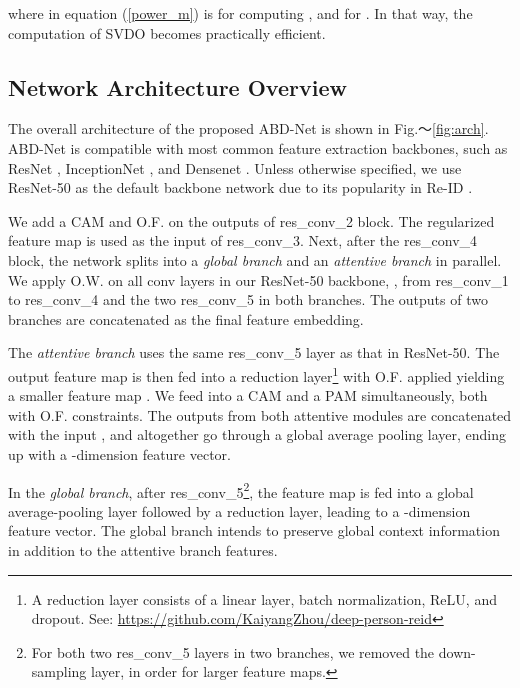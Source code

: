 \documentclass[10pt,twocolumn]{article}
\begin{document}
where  in equation (\ref{power_m}) is  for computing , and  for . In that way, the computation of SVDO becomes practically efficient.

\subsection{Network Architecture Overview} \label{sec:arc_overview}







The overall architecture of the proposed ABD-Net is shown in Fig.～\ref{fig:arch}.  ABD-Net is compatible with most common feature extraction backbones, such as ResNet \cite{he2016deep}, InceptionNet \cite{szegedy2017inception}, and Densenet \cite{huang2017densely}. Unless otherwise specified, we use ResNet-50 as the default backbone network due to its popularity in Re-ID \cite{li2018support,zeng2018person,wang2018learning,yang2018local,song2018mask,xu2018attention,Li_2018,Liu_2018}.


We add a CAM and O.F. on the outputs of res\_conv\_2 block. The regularized feature map is used as the input of res\_conv\_3. Next, after the res\_conv\_4 block, the network splits into a \textit{global branch} and an \textit{attentive branch} in parallel. We apply O.W. on all conv layers in our ResNet-50 backbone, , from res\_conv\_1 to res\_conv\_4 and the two res\_conv\_5 in both branches. The outputs of two branches are concatenated as the final feature embedding. 





The \textit{attentive branch} uses the same res\_conv\_5 layer as that in ResNet-50. The output feature map is then fed into a reduction layer\footnote{A reduction layer consists of a linear layer, batch normalization, ReLU, and dropout. See:  \footnotesize{{\url{https://github.com/KaiyangZhou/deep-person-reid}}}} with O.F. applied yielding a smaller 
feature map . We feed  into a CAM and a PAM simultaneously, both with O.F. constraints. The outputs from both attentive modules are concatenated with the input , and altogether go through a global average pooling layer, ending up with a -dimension feature vector. 


In the \textit{global branch}, after res\_conv\_5\footnote{For both two res\_conv\_5 layers in two branches, we removed the down-sampling layer, in order for larger feature maps.}, the feature map  is fed into a global average-pooling layer followed by a reduction layer, leading to a -dimension feature vector. The global branch intends to preserve global context information in addition to the attentive branch features.
\end{document}
